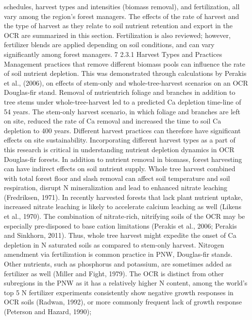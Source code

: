 \documentclass{article}
\begin{document}
schedules, harvest types and intensities (biomass removal), and fertilization, all vary among the
region’s forest managers. The effects of the rate of harvest and the type of harvest as they relate
to soil nutrient retention and export in the OCR are summarized in this section. Fertilization is
also reviewed; however, fertilizer blends are applied depending on soil conditions, and can vary
significantly among forest managers. 
7
2.3.1 Harvest Types and Practices
Management practices that remove different biomass pools can influence the rate of soil nutrient
depletion. This was demonstrated through calculations by Perakis et al., (2006), on effects of
stem-only and whole-tree-harvest scenarios on an OCR Douglas-fir stand. Removal of nutrientrich foliage and branches in addition to tree stems under whole-tree-harvest led to a predicted Ca
depletion time-line of 54 years. The stem-only harvest scenario, in which foliage and branches
are left on site, reduced the rate of Ca removal and increased the time to soil Ca depletion to 400
years. Different harvest practices can therefore have significant effects on site sustainability.
Incorporating different harvest types as a part of this research is critical in understanding nutrient
depletion dynamics in OCR Douglas-fir forests.
In addition to nutrient removal in biomass, forest harvesting can have indirect effects on soil
nutrient supply. Whole tree harvest combined with total forest floor and slash removal can affect
soil temperature and soil respiration, disrupt N mineralization and lead to enhanced nitrate
leaching (Fredriksen, 1971). In recently harvested forests that lack plant nutrient uptake,
increased nitrate leaching is likely to accelerate calcium leaching as well (Likens et al., 1970).
The combination of nitrate-rich, nitrifying soils of the OCR may be especially pre-disposed to
base cation limitations (Perakis et al., 2006; Perakis and Sinkhorn, 2011). Thus, whole tree
harvest might expedite the onset of Ca depletion in N saturated soils as compared to stem-only
harvest.
Nitrogen amendment via fertilization is common practice in PNW, Douglas-fir stands. Other
nutrients, such as phosphorus and potassium, are sometimes added as fertilizer as well (Miller and
Fight, 1979). The OCR is distinct from other subregions in the PNW as it has a relatively higher
N content, among the world’s top 5%
N fertilizer experiments consistently show negative growth responses in OCR soils (Radwan,
1992), or more commonly frequent lack of growth response (Peterson and Hazard, 1990);
\end{document}
